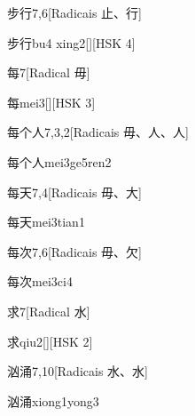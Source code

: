 \begin{entry}{步行}{7,6}[Radicais ⽌、⾏]
  \begin{phonetics}{步行}{bu4 xing2}[][HSK 4]
  \end{phonetics}
\end{entry}

\begin{entry}{每}{7}[Radical ⽏]
  \begin{phonetics}{每}{mei3}[][HSK 3]
  \end{phonetics}
\end{entry}

\begin{entry}{每个人}{7,3,2}[Radicais ⽏、⼈、⼈]
  \begin{phonetics}{每个人}{mei3ge5ren2}
  \end{phonetics}
\end{entry}

\begin{entry}{每天}{7,4}[Radicais ⽏、⼤]
  \begin{phonetics}{每天}{mei3tian1}
  \end{phonetics}
\end{entry}

\begin{entry}{每次}{7,6}[Radicais ⽏、⽋]
  \begin{phonetics}{每次}{mei3ci4}
  \end{phonetics}
\end{entry}

\begin{entry}{求}{7}[Radical ⽔]
  \begin{phonetics}{求}{qiu2}[][HSK 2]
  \end{phonetics}
\end{entry}

\begin{entry}{汹涌}{7,10}[Radicais ⽔、⽔]
  \begin{phonetics}{汹涌}{xiong1yong3}
  \end{phonetics}
\end{entry}


